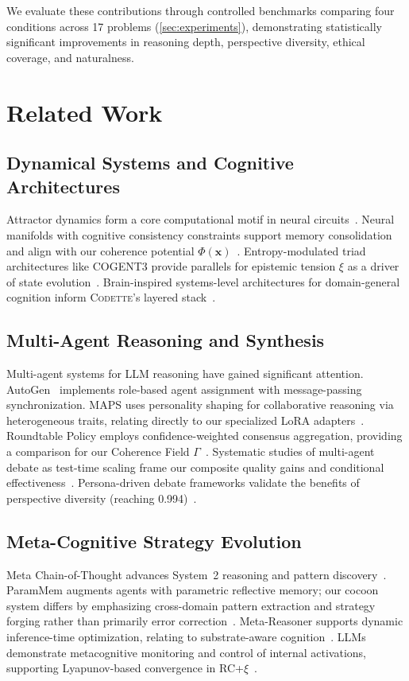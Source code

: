 \documentclass[11pt,a4paper]{article}
\newcommand{\codette}{\textsc{Codette}}
\begin{document}
We evaluate these contributions through controlled benchmarks comparing four
conditions across 17 problems (\cref{sec:experiments}), demonstrating
statistically significant improvements in reasoning depth, perspective
diversity, ethical coverage, and naturalness.

\section{Related Work}
\label{sec:related}

\subsection{Dynamical Systems and Cognitive Architectures}
Attractor dynamics form a core computational motif in neural
circuits~\citep{fakhoury2025models}. Neural manifolds with cognitive
consistency constraints support memory consolidation and align with our
coherence potential $\Phi(\mathbf{x})$~\citep{nguyen2025neural}.
Entropy-modulated triad architectures like COGENT3 provide parallels for
epistemic tension $\xi$ as a driver of state
evolution~\citep{salazar2025cogent3}. Brain-inspired systems-level
architectures for domain-general cognition inform \codette{}'s layered
stack~\citep{achterberg2023building}.

\subsection{Multi-Agent Reasoning and Synthesis}
Multi-agent systems for LLM reasoning have gained significant attention.
AutoGen~\citep{wu2023autogen} implements role-based agent assignment with
message-passing synchronization. MAPS uses personality shaping for
collaborative reasoning via heterogeneous traits, relating directly to our
specialized LoRA adapters~\citep{zhang2025maps}. Roundtable Policy employs
confidence-weighted consensus aggregation, providing a comparison for our
Coherence Field $\Gamma$~\citep{yao2025roundtable}. Systematic studies of
multi-agent debate as test-time scaling frame our composite quality gains and
conditional effectiveness~\citep{yang2025revisiting}. Persona-driven debate
frameworks validate the benefits of perspective diversity (reaching
0.994)~\citep{hu2025debate}.

\subsection{Meta-Cognitive Strategy Evolution}
Meta Chain-of-Thought advances System~2 reasoning and pattern
discovery~\citep{xiang2025meta}. ParamMem augments agents with parametric
reflective memory; our cocoon system differs by emphasizing cross-domain
pattern extraction and strategy forging rather than primarily error
correction~\citep{yao2026parammem}. Meta-Reasoner supports dynamic
inference-time optimization, relating to substrate-aware
cognition~\citep{sui2025metareasoner}. LLMs demonstrate metacognitive
monitoring and control of internal activations, supporting Lyapunov-based
convergence in RC+$\xi$~\citep{ji2025metacognitive}.
\end{document}
